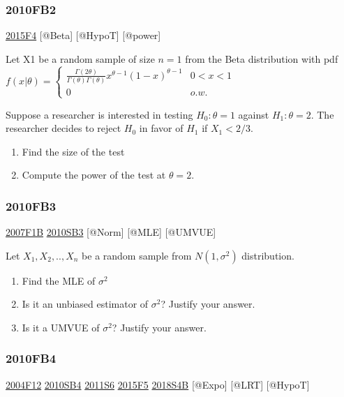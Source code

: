 \documentclass[6pt,Portrait]{article}
\begin{document}
\hypertarget{fb2-1}{%
\subsubsection{2010FB2}\label{fb2-1}}

\protect\hyperlink{f4-5}{2015F4} {[}@Beta{]} {[}@HypoT{]} {[}@power{]}

Let X1 be a random sample of size \(n=1\) from the Beta distribution
with pdf
\(f(x|\theta)=\begin{cases}\frac{\Gamma(2\theta)}{\Gamma(\theta)\Gamma(\theta)}x^{\theta-1}(1-x)^{\theta-1}&0<x<1\\0&o.w.\end{cases}\)

Suppose a researcher is interested in testing \(H_0:\theta=1\) against
\(H_1:\theta=2\). The researcher decides to reject \(H_0\) in favor of
\(H_1\) if \(X_1<2/3\).

\begin{enumerate}
\def\labelenumi{(\alph{enumi})}
\item
  Find the size of the test
\item
  Compute the power of the test at \(\theta=2\).
\end{enumerate}

\hypertarget{fb3-1}{%
\subsubsection{2010FB3}\label{fb3-1}}

\protect\hyperlink{f1b}{2007F1B} \protect\hyperlink{sb3-1}{2010SB3}
{[}@Norm{]} {[}@MLE{]} {[}@UMVUE{]}

Let \(X_1,X_2,..,X_n\) be a random sample from \(N(1,\sigma^2)\)
distribution.

\begin{enumerate}
\def\labelenumi{(\alph{enumi})}
\item
  Find the MLE of \(\sigma^2\)
\item
  Is it an unbiased estimator of \(\sigma^2\)? Justify your answer.
\item
  Is it a UMVUE of \(\sigma^2\)? Justify your answer.
\end{enumerate}

\hypertarget{fb4-1}{%
\subsubsection{2010FB4}\label{fb4-1}}

\protect\hyperlink{f12}{2004F12} \protect\hyperlink{sb4}{2010SB4}
\protect\hyperlink{s6-2}{2011S6} \protect\hyperlink{f5-5}{2015F5}
\protect\hyperlink{s4b-2}{2018S4B} {[}@Expo{]} {[}@LRT{]} {[}@HypoT{]}
\end{document}
